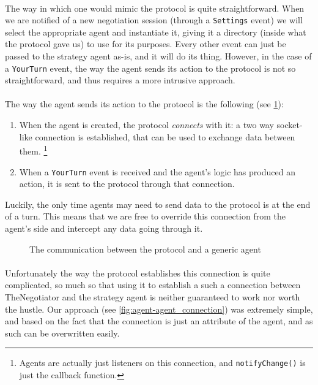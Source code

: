 \paragraph*{}
The way in which one would mimic the protocol is quite straightforward. When we are notified of a new negotiation session (through a \texttt{Settings} event) we will select the appropriate agent and instantiate it, giving it a directory (inside what the protocol gave us) to use for its purposes. Every other event can just be passed to the strategy agent %
as-is, and it will do its thing. However, in the case of a \texttt{YourTurn} event, the way the agent sends its action to the protocol is not so straightforward, and thus requires a more intrusive approach. %

\paragraph*{}
The way the agent sends its action to the protocol is the following (see \cref{fig:protocol-agent_connection}):
\begin{enumerate}
    \item When the agent is created, the protocol \emph{connects} with it: a two way socket-like connection is established, that can be used to exchange data between them. \footnote{Agents are actually just listeners on this connection, and \texttt{notifyChange()} is just the callback function.}
    
    \item When a \texttt{YourTurn} event is received and the agent's logic has produced an action, it is sent to the protocol through that connection.
\end{enumerate}
Luckily, the only time agents may need to send data to the protocol is at the end of a turn. This means that we are free to override this connection from the agent's side and intercept any data going through it.

\begin{figure}[H]
\centering
{}
\captionsetup{justification=centering}
\caption{The communication between the protocol and a generic agent}
\label{fig:protocol-agent_connection}
\end{figure}


\paragraph*{}
Unfortunately the way the protocol establishes this connection is quite complicated, so much so that using it to establish a such a connection between TheNegotiator and the strategy agent is neither guaranteed to work nor worth the hustle. %
Our approach (see \cref{fig:agent-agent_connection}) was extremely simple, and based on the fact that the connection is just an attribute of the agent, and as such can be overwritten easily.

